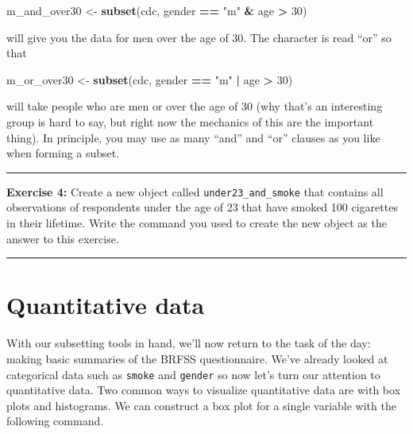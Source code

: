 \documentclass[]{book}
\newenvironment{Shaded}{\begin{snugshade}}{\end{snugshade}}
\newcommand{\KeywordTok}[1]{\textcolor[rgb]{0.13,0.29,0.53}{\textbf{#1}}}
\newcommand{\DecValTok}[1]{\textcolor[rgb]{0.00,0.00,0.81}{#1}}
\newcommand{\StringTok}[1]{\textcolor[rgb]{0.31,0.60,0.02}{#1}}
\newcommand{\OperatorTok}[1]{\textcolor[rgb]{0.81,0.36,0.00}{\textbf{#1}}}
\newcommand{\NormalTok}[1]{#1}
\theoremstyle{definition}
\theoremstyle{definition}
\theoremstyle{definition}
\theoremstyle{remark}
\begin{document}
\begin{Shaded}
\begin{Highlighting}[]
\NormalTok{m_and_over30 <-}\StringTok{ }\KeywordTok{subset}\NormalTok{(cdc, gender }\OperatorTok{==}\StringTok{ "m"} \OperatorTok{&}\StringTok{ }\NormalTok{age }\OperatorTok{>}\StringTok{ }\DecValTok{30}\NormalTok{)}
\end{Highlighting}
\end{Shaded}

will give you the data for men over the age of 30. The
\texttt{\textbar{}} character is read ``or'' so that

\begin{Shaded}
\begin{Highlighting}[]
\NormalTok{m_or_over30 <-}\StringTok{ }\KeywordTok{subset}\NormalTok{(cdc, gender }\OperatorTok{==}\StringTok{ "m"} \OperatorTok{|}\StringTok{ }\NormalTok{age }\OperatorTok{>}\StringTok{ }\DecValTok{30}\NormalTok{)}
\end{Highlighting}
\end{Shaded}

will take people who are men or over the age of 30 (why that's an
interesting group is hard to say, but right now the mechanics of this
are the important thing). In principle, you may use as many ``and'' and
``or'' clauses as you like when forming a subset.

\begin{center}\rule{0.5\linewidth}{\linethickness}\end{center}

\textbf{Exercise 4:} Create a new object called
\texttt{under23\_and\_smoke} that contains all observations of
respondents under the age of 23 that have smoked 100 cigarettes in their
lifetime. Write the command you used to create the new object as the
answer to this exercise.

\begin{center}\rule{0.5\linewidth}{\linethickness}\end{center}

\section{Quantitative data}\label{quantitative-data}

With our subsetting tools in hand, we'll now return to the task of the
day: making basic summaries of the BRFSS questionnaire. We've already
looked at categorical data such as \texttt{smoke} and \texttt{gender} so
now let's turn our attention to quantitative data. Two common ways to
visualize quantitative data are with box plots and histograms. We can
construct a box plot for a single variable with the following command.
\end{document}
